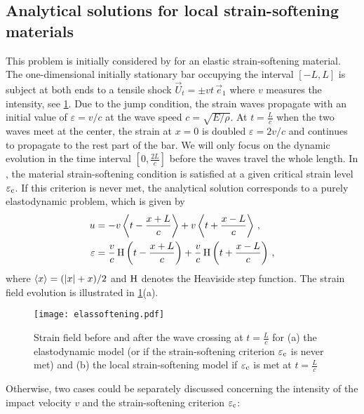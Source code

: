 \subsection{Analytical solutions for local strain-softening materials}
This problem is initially considered by \cite{Bazant:1985aa} for an elastic strain-softening material. The one-dimensional initially stationary bar occupying the interval $[-L,L]$ is subject at both ends to a tensile shock $\vec{U}_t=\pm vt\,\vec{e}_1$ where $v$ measures the intensity, see \cref{fig:elassoftening}. Due to the jump condition, the strain waves propagate with an initial value of $\varepsilon=v/c$ at the wave speed $c=\sqrt{E/\rho}$. At $t=\frac{L}{c}$ when the two waves meet at the center, the strain at $x=0$ is doubled $\varepsilon=2v/c$ and continues to propagate to the rest part of the bar. We will only focus on the dynamic evolution in the time interval $[0,\frac{2L}{c}]$ before the waves travel the whole length. In \cite{Bazant:1985aa}, the material strain-softening condition is satisfied at a given critical strain level $\varepsilon_{\mathrm{c}}$. If this criterion is never met, the analytical solution corresponds to a purely elastodynamic problem, which is given by
\begin{align*}
u &= -v\Braket{t-\frac{x+L}{c}}+v\Braket{t+\frac{x-L}{c}}\,, \\
\varepsilon &= \frac{v}{c}\operatorname{H}\left(t-\frac{x+L}{c}\right)+\frac{v}{c}\operatorname{H}\left(t+\frac{x-L}{c}\right)\,,
\end{align*}
where $\Braket{x}=(\left\lvert{x}\right\rvert+x)/2$ and $\operatorname{H}$ denotes the Heaviside step function. The strain field evolution is illustrated in \cref{fig:elassoftening}(a). 
\begin{figure}[htbp]
\centering
\texttt{[image: elassoftening.pdf]}
\caption{Strain field before and after the wave crossing at $t=\frac{L}{c}$ for (a) the elastodynamic model (or if the strain-softening criterion $\varepsilon_{\mathrm{c}}$ is never met) and (b) the local strain-softening model if $\varepsilon_{\mathrm{c}}$ is met at $t=\frac{L}{c}$} \label{fig:elassoftening}
\end{figure}
Otherwise, two cases could be separately discussed concerning the intensity of the impact velocity $v$ and the strain-softening criterion $\varepsilon_{\mathrm{c}}$:
